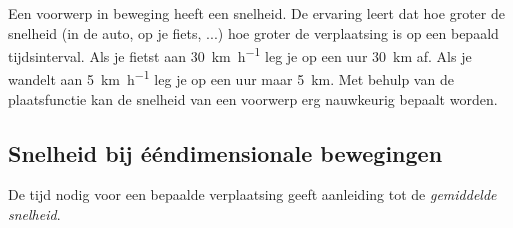 \documentclass{ximera}
\begin{document}
	\author{Bart Lambregs,Vincent Gellens}
    \xmsource\xmuitleg



   
  
  
  
  




Een voorwerp in beweging heeft een snelheid. 
De ervaring leert dat hoe groter de snelheid (in de auto, op je fiets, ...) hoe groter de verplaatsing is op een bepaald tijdsinterval. 
Als je fietst aan \SI{30}{\kilo\meter\per\hour} leg je op een uur \SI{30}{km} af. 
Als je wandelt aan \SI{5}{\kilo\meter\per\hour} leg je op een uur maar \SI{5}{km}. 
Met behulp van de plaatsfunctie kan de snelheid van een voorwerp erg nauwkeurig bepaalt worden. 





\subsection*{Snelheid bij ééndimensionale bewegingen}



De tijd nodig voor een bepaalde verplaatsing geeft aanleiding tot de \textit{gemiddelde snelheid}. 

\end{document}
